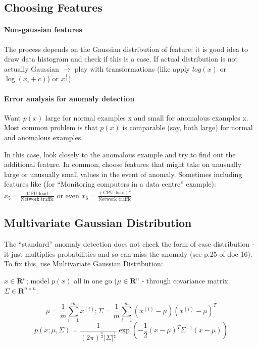 \documentclass{scrartcl}
\begin{document}
\subsection{Choosing Features}
\label{sec:15-6}

\paragraph{Non-gaussian features}

The process depends on the Gaussian distribution of feature: it is
good idea to draw data histogram and check if this is a case. If
actual distribution is not actually Gaussian $\to$ play with
transformations (like apply $log(x)$ or $\log(x_i + c)$) or
$x^{\frac{1}{3}}$).

\paragraph{Error analysis for anomaly detection}

Want $p(x)$ large for normal examples x and small for anomalous
examples x. Most common problem is that $p(x)$ is comparable (say,
both large) for normal and anomalous examples.

In this case, look closely to the anomalous example and try to find
out the additional feature. In common, choose features that might take
on unusually large or unusually small values in the event of anomaly.
Sometimes including features like (for ``Monitoring computers in a
data centre'' example): $x_5 = \frac{\textrm{CPU
    load}}{\textrm{Network traffic}}$ or even $x_6 =
\frac{(\textrm{CPU load})^2}{\textrm{Network traffic}}$

\subsection{Multivariate Gaussian Distribution}
\label{sec:15-7}

The ``standard'' anomaly detection does not check the form of case
distribution - it just multiplies probabilities and so can miss the
anomaly (see p.25 of doc 16). To fix this, use Multivariate Gaussian
Distribution: 

$x \in \mathbf{R}^n$; model $p(x)$ all in one go ($\mu \in
\mathbf{R}^n$ - through covariance matrix $\Sigma \in \mathbf{R}^{n
  \times n} $:

\[ \mu = \frac{1}{m} \sum \limits_{i=1}^{m} x^{(i)}; \Sigma =
\frac{1}{m}\sum \limits_{i=1}^{m}(x^{(i)}-\mu)(x^{(i)}- \mu)^T \]
\[p(x; \mu, \Sigma) = \frac{1}{(2 \pi)^{\frac{n}{2}}
  |\Sigma|^{\frac{1}{2}}} \exp(-\frac{1}{2}(x - \mu)^T
\Sigma^{-1}(x-\mu))\] 
\end{document}
